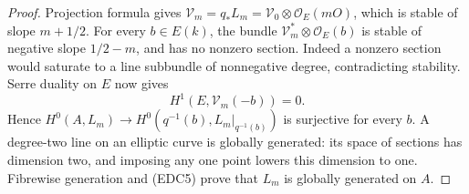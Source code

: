 \begin{proof}
Projection formula gives
\(\mathcal V_m=q_*L_m=\mathcal V_0\otimes\mathcal O_E(mO)\),
which is stable of slope \(m+1/2\). For every \(b\in E(k)\),
the bundle \(\mathcal V_m^*\otimes\mathcal O_E(b)\) is stable
of negative slope \(1/2-m\), and has no nonzero section.
Indeed a nonzero section would saturate to a line subbundle of
nonnegative degree, contradicting stability. Serre duality on
\(E\) now gives
\[
                       H^1(E,\mathcal V_m(-b))=0.    \tag{EDC5}
\]
Hence \(H^0(A,L_m)\to H^0(q^{-1}(b),L_m|_{q^{-1}(b)})\)
is surjective for every \(b\). A degree-two line on an elliptic
curve is globally generated: its space of sections has dimension
two, and imposing any one point lowers this dimension to one.
Fibrewise generation and (EDC5) prove that \(L_m\) is globally
generated on \(A\).
\end{proof}

